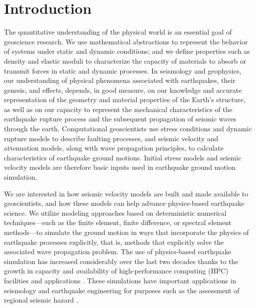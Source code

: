 
\section{Introduction}
\label{sec:introduction}

The quantitative understanding of the physical world is an essential goal of geoscience research. We use mathematical abstractions to represent the behavior of systems under static and dynamic conditions; and we define properties such as density and elastic moduli to characterize the capacity of materials to absorb or transmit forces in static and dynamic processes. In seismology and geophysics, our understanding of physical phenomena associated with earthquakes, their genesis, and effects, depends, in good measure, on our knowledge and accurate representation of the geometry and material properties of the Earth's structure, as well as on our capacity to represent the mechanical characteristics of the earthquake rupture process and the subsequent propagation of seismic waves through the earth. Computational geoscientists use stress conditions and dynamic rupture models to describe faulting processes, and seismic velocity and attenuation models, along with wave propagation principles, to calculate characteristics of earthquake ground motions. Initial stress models and seismic velocity models are therefore basic inputs used in earthquake ground motion simulation.

We are interested in how seismic velocity models are built and made available to geoscientists, and how these models can help advance physics-based earthquake science. We utilize modeling approaches based on deterministic numerical techniques---such as the finite element, finite difference, or spectral element methods---to simulate the ground motion in ways that incorporate the physics of earthquake processes explicitly, that is, methods that explicitly solve the associated wave propagation problem. The use of physics-based earthquake simulation has increased considerably over the last two decades thanks to the growth in capacity and availability of high-performance computing (HPC) facilities and applications \citep[e.g.,][]{Aagaard_2008_BSSA2, Olsen_2009_GRL, Bielak_2010_GJI, Cui_2010_Proc}. These simulations have important applications in seismology and earthquake engineering for purposes such as the assessment of regional seismic hazard \citep[e.g.,][]{Graves_2011_PAG}.

